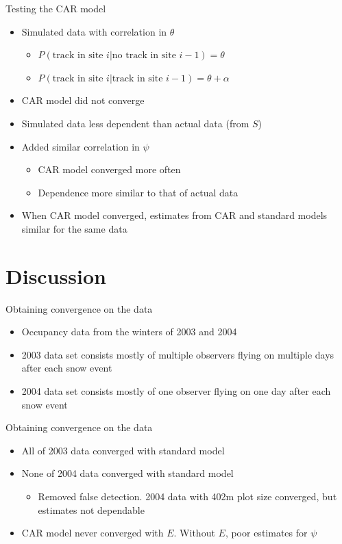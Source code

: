 \documentclass{beamer}
\begin{document}
\begin{frame}{Testing the CAR model}
	\begin{itemize}
		\item Simulated data with correlation in $\theta$
		\begin{itemize}
			\item $P(\text{track in site }i|\text{no track in site }i-1)=\theta$
			\item $P(\text{track in site }i|\text{track in site }i-1)=\theta+
			\alpha$
		\end{itemize}
		\item CAR model did not converge
		\item Simulated data less dependent than actual data (from $S$)
		\item Added similar correlation in $\psi$
		\begin{itemize}
			\item CAR model converged more often
			\item Dependence more similar to that of actual data
		\end{itemize}
		\item When CAR model converged, estimates from CAR and standard models
		similar for the same data
	\end{itemize}
\end{frame}

\section{Discussion}

\begin{frame}{Obtaining convergence on the data}
	\begin{itemize}
		\item Occupancy data from the winters of 2003 and 2004
		\item 2003 data set consists mostly of multiple observers flying on
		multiple days after each snow event
		\item 2004 data set consists mostly of one observer flying on one day
		after each snow event
	\end{itemize}
\end{frame}

\begin{frame}{Obtaining convergence on the data}
	\begin{itemize}
		\item All of 2003 data converged with standard model
		\item None of 2004 data converged with standard model
		\begin{itemize}
			\item Removed false detection. 2004 data with 402m plot size
			converged, but estimates not dependable
		\end{itemize}
		\item CAR model never converged with $E$. Without $E$, poor
		estimates for $\psi$
	\end{itemize}
\end{frame}
\end{document}

